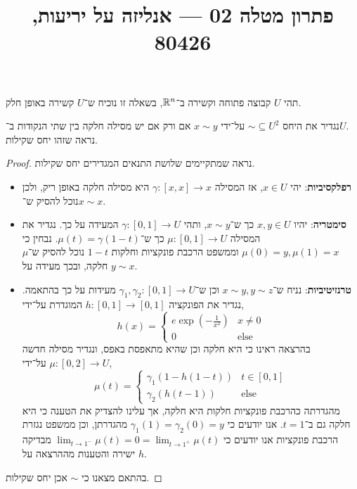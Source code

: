 
\title{פתרון מטלה 02 --- אנליזה על יריעות, 80426}


\maketitle
\maketitleprint{}

\question{}
תהי $U$ קבוצה פתוחה וקשירה ב־$\mathbb{R}^n$, בשאלה זו נוכיח ש־$U$ קשירה באופן חלק.

\subquestion[2]
נגדיר את היחס $\sim \subseteq U^2$ על־ידי $x \sim y$ אם ורק אם יש מסילה חלקה בין שתי הנקודות ב־$U$. \\
נראה שזהו יחס שקילות.
\begin{proof}
	נראה שמתקיימים שלושת התנאים המגדירים יחס שקילות.
	\begin{itemize}
		\item \textbf{רפלקסיביות}:
			יהי $x \in U$, אז המסילה $\gamma : [x, x] \to x$ היא מסילה חלקה באופן ריק, ולכן נוכל להסיק ש־$x \sim x$.
		\item \textbf{סימטריה}:
			יהיו $x, y \in U$ כך ש־$x \sim y$, ותהי $\gamma : [0, 1] \to U$ המעידה על כך.
			נגדיר את המסילה $\mu : [0, 1] \to U$ כך ש־$\mu(t) = \gamma(1 - t)$.
			נבחין כי $\mu(0) = y, \mu(1) = x$ וממשפט הרכבת פונקציות וחלקות $1 - t$ נוכל להסיק ש־$\mu$ חלקה, ובכך מעידה על $y \sim x$.
		\item \textbf{טרנזיטיביות}:
			נניח ש־$x \sim y, y \sim z$ וכן ש־$\gamma_1, \gamma_2 : [0, 1] \to U$ מעידות על כך בהתאמה.
			נגדיר את הפונקציה $h : [0, 1] \to [0, 1]$ המוגדרת על־ידי,
			\[
				h(x) = \begin{cases}
					e \exp(-\frac{1}{x^2}) & x \ne 0 \\
					0 & \text{else}
				\end{cases}
			\]
			בהרצאה ראינו כי היא חלקה וכן שהיא מתאפסת באפס, ונגדיר מסילה חדשה $\mu : [0, 2] \to U$ על־ידי,
			\[
				\mu(t)
				= \begin{cases}
					\gamma_1(1 - h(1 - t)) & t \in [0, 1] \\
					\gamma_2(h(t - 1)) & \text{else}
				\end{cases}
			\]
			מהגדרתה כהרכבת פונקציות חלקות היא חלקה, אך עלינו להצדיק את הטענה כי היא חלקה גם ב־$t = 1$.
			אנו יודעים כי $\gamma_1(1) = \gamma_2(0) = y$ מהגדרתן, וכן ממשפט נגזרת הרכבת פונקציות אנו יודעים כי $\lim_{t \to 1^-} \mu(t) = 0 = \lim_{t \to 1^+} \mu(t)$ מבדיקה ישירה והטענות מההרצאה על $h$.
	\end{itemize}
	בהתאם מצאנו כי $\sim$ אכן יחס שקילות.
\end{proof}

